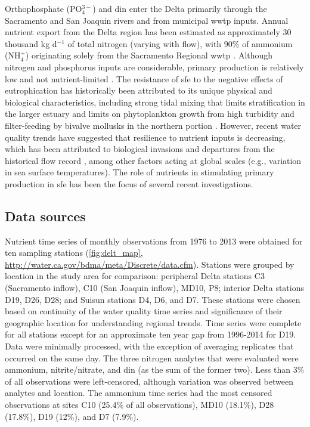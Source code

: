 \documentclass[letterpaper,12pt,oneside]{article}\usepackage[]{graphicx}\usepackage[]{color}
\begin{document}
Orthophosphate (PO$_4^{3-}$) and \ac{din} enter the Delta primarily through the Sacramento and San Joaquin rivers and from municipal \ac{wwtp} inputs.  Annual nutrient export from the Delta region has been estimated as approximately 30 thousand kg d$^{-1}$ of total nitrogen (varying with flow\cite{Novick15}), with 90\% of ammonium (NH$_4^{+}$) originating solely from the Sacramento Regional \ac{wwtp} \cite{Jassby08}.  Although nitrogen and phosphorus inputs are considerable, primary production is relatively low and not nutrient-limited \cite{Jassby02,Kimmerer12}.  The resistance of \ac{sfe} to the negative effects of eutrophication has historically been attributed to its unique physical and biological characteristics, including strong tidal mixing that limits stratification in the larger estuary \cite{Cloern96,Thompson08} and limits on phytoplankton growth from high turbidity and filter-feeding by bivalve mollusks in the northern portion \cite{Thompson08,Crauder16}.  However, recent water quality trends have suggested that resilience to nutrient inputs is decreasing\cite{Lehman05,Cloern07,Lehman10}, which has been attributed to biological invasions \cite{Cohen98} and departures from the historical flow record \cite{Enright09,Cloern12b}, among other factors acting at global scales (e.g., variation in sea surface temperatures).\cite{Cloern07}  The role of nutrients in stimulating primary production in \ac{sfe} has been the focus of several recent investigations.\cite{Dugdale07,Parker12,Glibert14}

\subsection{Data sources}



Nutrient time series of monthly observations from 1976 to 2013 were obtained for ten sampling stations (\cref{fig:delt_map}, \url{http://water.ca.gov/bdma/meta/Discrete/data.cfm})\cite{IEP13}.  Stations were grouped by location in the study area for comparison: peripheral Delta stations C3 (Sacramento inflow), C10 (San Joaquin inflow), MD10, P8; interior Delta stations D19, D26, D28; and Suisun stations D4, D6, and D7.  These stations were chosen based on continuity of the water quality time series and significance of their geographic location for understanding regional trends.  Time series were complete for all stations except for an approximate ten year gap from 1996-2014 for D19.  Data were minimally processed, with the exception of averaging replicates that occurred on the same day.  The three nitrogen analytes that were evaluated were ammonium, nitrite/nitrate, and \ac{din} (as the sum of the former two). Less than 3\% of all observations were left-censored, although variation was observed between analytes and location.  The ammonium time series had the most censored observations at sites C10 (25.4\% of all observations), MD10 (18.1\%), D28 (17.8\%), D19 (12\%), and D7 (7.9\%).
\end{document}

